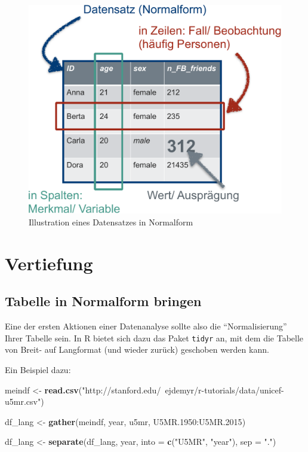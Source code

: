 \documentclass[12pt,ngerman,]{book}
\newenvironment{Shaded}{\begin{snugshade}}{\end{snugshade}}
\newcommand{\KeywordTok}[1]{\textcolor[rgb]{0.13,0.29,0.53}{\textbf{{#1}}}}
\newcommand{\DataTypeTok}[1]{\textcolor[rgb]{0.13,0.29,0.53}{{#1}}}
\newcommand{\FloatTok}[1]{\textcolor[rgb]{0.00,0.00,0.81}{{#1}}}
\newcommand{\StringTok}[1]{\textcolor[rgb]{0.31,0.60,0.02}{{#1}}}
\newcommand{\NormalTok}[1]{{#1}}
\renewenvironment{Shaded}{\begin{kframe}}{\end{kframe}}
\begin{document}
\begin{figure}

{\centering \includegraphics[width=0.7\linewidth]{images/Normalform} 

}

\caption{Illustration eines Datensatzes in Normalform}\label{fig:fig-Normalform}
\end{figure}

\section{Vertiefung}\label{vertiefung}

\subsection{Tabelle in Normalform
bringen}\label{tabelle-in-normalform-bringen}

Eine der ersten Aktionen einer Datenanalyse sollte also die
``Normalisierung'' Ihrer Tabelle sein. In R bietet sich dazu das Paket
\texttt{tidyr} an, mit dem die Tabelle von Breit- auf Langformat (und
wieder zurück) geschoben werden kann.

Ein Beispiel dazu:

\begin{Shaded}
\begin{Highlighting}[]
\NormalTok{meindf <-}\StringTok{ }\KeywordTok{read.csv}\NormalTok{(}\StringTok{"http://stanford.edu/~ejdemyr/r-tutorials/data/unicef-u5mr.csv"}\NormalTok{)}

\NormalTok{df_lang <-}\StringTok{ }\KeywordTok{gather}\NormalTok{(meindf, year, u5mr, U5MR}\FloatTok{.1950}\NormalTok{:U5MR}\FloatTok{.2015}\NormalTok{)}

\NormalTok{df_lang <-}\StringTok{ }\KeywordTok{separate}\NormalTok{(df_lang, year, }\DataTypeTok{into =} \KeywordTok{c}\NormalTok{(}\StringTok{"U5MR"}\NormalTok{, }\StringTok{"year"}\NormalTok{), }\DataTypeTok{sep =} \StringTok{"."}\NormalTok{)}
\end{Highlighting}
\end{Shaded}
\end{document}
